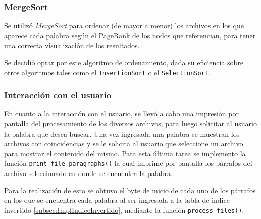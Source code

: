 \subsubsection*{MergeSort}
Se utilizó \textit{MergeSort} para ordenar (de mayor a menor) los archivos en los que aparece cada palabra según el PageRank de los nodos que referencian, para tener una correcta visualización de los resultados.

Se decidió optar por este algoritmo de ordenamiento, dada su eficiencia sobre otros algoritmos tales como el \texttt{InsertionSort} o el \texttt{SelectionSort}.

\subsubsection*{Interacción con el usuario}

En cuanto a la interacción con el usuario, se llevó a cabo una impresión por pantalla del procesamiento de los diversos archivos, para luego solicitar al usuario la palabra que desea buscar. Una vez ingresada una palabra se muestran los archivos con coincidencias y se le solicita al usuario que seleccione un archivo para mostrar el contenido del mismo. Para esta última tarea se implemento la función \texttt{print\_file\_paragraphs()} la cual imprime por pantalla los párrafos del archivo seleccionado en donde se encuentra la palabra.

Para la realización de esto se obtuvo el byte de inicio de cada uno de los párrafos en los que se encuentra cada palabra al ser ingresada a la tabla de indice invertido \ref{subsec:ImplIndiceInvertido}, mediante la función \texttt{process\_files()}.
